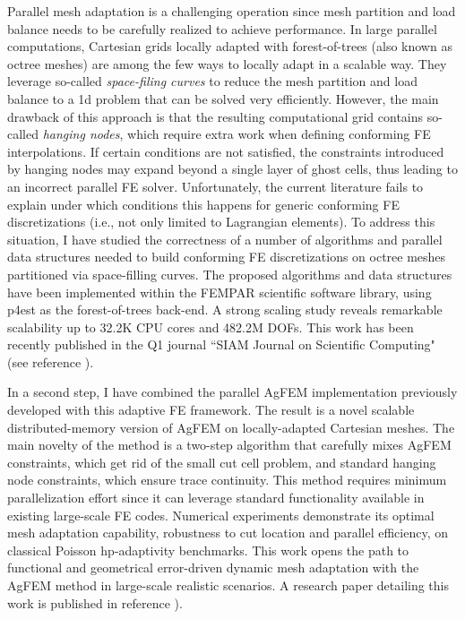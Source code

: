 \documentclass{article}
\begin{document}
 Parallel mesh adaptation is a challenging operation since mesh partition and load balance needs to be carefully realized to achieve performance.  In large parallel computations, Cartesian grids locally adapted with forest-of-trees (also known as octree meshes) are among the few ways to locally adapt in a scalable way. They leverage so-called \emph{space-filing curves} to reduce the mesh partition and load balance to a 1d problem that can be solved very efficiently. However, the main drawback of this approach is that the resulting computational grid contains so-called \emph{hanging nodes}, which require extra work when defining conforming FE interpolations. If certain conditions are not satisfied, the constraints introduced by hanging nodes may expand beyond a single layer of ghost cells, thus leading to an incorrect parallel FE solver. Unfortunately, the current literature fails to explain under which conditions this happens for generic conforming FE discretizations (i.e., not only limited to Lagrangian elements). To address this situation, I have studied the correctness of a number of algorithms and parallel data structures needed to build conforming FE discretizations on octree meshes partitioned via space-filling curves.  The proposed algorithms and data structures have been implemented within the FEMPAR scientific software library, using p4est as the forest-of-trees back-end. A strong scaling study reveals remarkable scalability up to 32.2K CPU cores and 482.2M DOFs. {This work has been recently published in the Q1 journal ``SIAM Journal on Scientific Computing"} (see reference \cite{badia_2019a} ).

 In a second step, I have combined the parallel AgFEM implementation previously developed with this adaptive FE framework. The result is a novel scalable distributed-memory version of AgFEM on locally-adapted Cartesian meshes. The main novelty of the method is a two-step algorithm that carefully mixes AgFEM constraints, which get rid of the small cut cell problem, and standard hanging node constraints, which ensure trace continuity. This method requires minimum parallelization effort since it can leverage standard functionality available in existing large-scale FE codes. Numerical experiments demonstrate its optimal mesh adaptation capability, robustness to cut location and parallel efficiency, on classical Poisson hp-adaptivity benchmarks. This work opens the path to functional and geometrical error-driven dynamic mesh adaptation with the AgFEM method in large-scale realistic scenarios. A research paper detailing this work is published in reference \cite{badia_2020a}).
\end{document}
